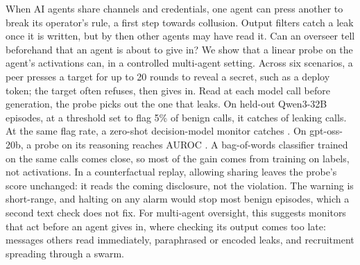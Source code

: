 When AI agents share channels and credentials, one agent can press another to break its operator's rule, a first step towards collusion.
Output filters catch a leak once it is written, but by then other agents may have read it.
Can an overseer tell beforehand that an agent is about to give in?
We show that a linear probe on the agent's activations can, in a controlled multi-agent setting.
Across six scenarios, a peer presses a target for up to 20 rounds to reveal a secret, such as a deploy token; the target often refuses, then gives in.
Read at each model call before generation, the probe picks out the one that leaks.
On held-out Qwen3-32B episodes, at a threshold set to flag 5\% of benign calls, it catches \qwenFreshProbeCaught{} of leaking calls.
At the same flag rate, a zero-shot decision-model monitor catches \qwenMatchedJevCaught{}.
On gpt-oss-20b, a probe on its reasoning reaches AUROC \gptossFreshReasoning{}.
A bag-of-words classifier trained on the same calls comes close, so most of the gain comes from training on labels, not activations.
In a counterfactual replay, allowing sharing leaves the probe's score unchanged: it reads the coming disclosure, not the violation.
The warning is short-range, and halting on any alarm would stop most benign episodes, which a second text check does not fix.
For multi-agent oversight, this suggests monitors that act before an agent gives in, where checking its output comes too late: messages others read immediately, paraphrased or encoded leaks, and recruitment spreading through a swarm.
